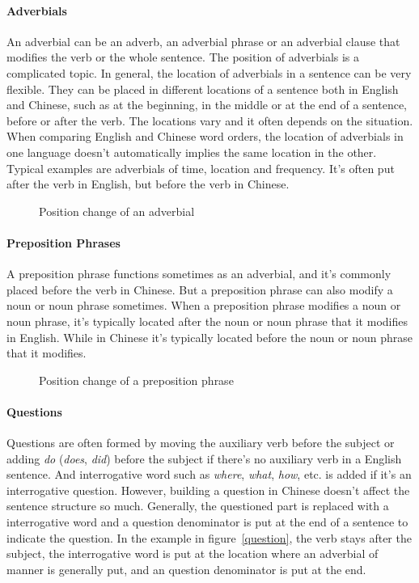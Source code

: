 \paragraph{Adverbials}
An adverbial can be an adverb, an adverbial phrase or an adverbial clause that modifies the verb or the whole sentence. The position of adverbials is a complicated topic. In general, the location of adverbials in a sentence can be very flexible. They can be placed in different locations of a sentence both in English and Chinese, such as at the beginning, in the middle or at the end of a sentence, before or after the verb. The locations vary and it often depends on the situation. When comparing English and Chinese word orders, the location of adverbials in one language doesn't automatically implies the same location in the other. Typical examples are adverbials of time, location and frequency. It's often put after the verb in English, but before the verb in Chinese. 
\begin{figure}[H]
\centering

\caption{Position change of an adverbial}
\end{figure}

\paragraph{Preposition Phrases}
A preposition phrase functions sometimes as an adverbial, and it's commonly placed before the verb in Chinese. But a preposition phrase can also modify a noun or noun phrase sometimes. When a preposition phrase modifies a noun or noun phrase, it's typically located after the noun or noun phrase that it modifies in English. While in Chinese it's typically located before the noun or noun phrase that it modifies.

\begin{figure}[H]
\centering

\caption{Position change of a preposition phrase}
\end{figure}

\paragraph{Questions}
Questions are often formed by moving the auxiliary verb before the subject or adding \emph{do} (\emph{does}, \emph{did}) before the subject if there's no auxiliary verb in a English sentence. And interrogative word such as \emph{where}, \emph{what}, \emph{how}, etc. is added if it's an interrogative question. However, building a question in Chinese doesn't affect the sentence structure so much. Generally, the questioned part is replaced with a interrogative word and a question denominator is put at the end of a sentence to indicate the question. In the example in figure~\ref{question}, the verb stays after the subject, the interrogative word is put at the location where an adverbial of manner is generally put, and an question denominator is put at the end.

